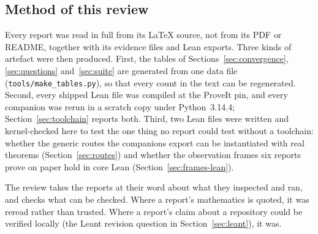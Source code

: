 \documentclass[11pt,a4paper]{article}
\newcommand{\code}[1]{\nolinkurl{#1}}
\theoremstyle{definition}
\theoremstyle{plain}
\begin{document}
\subsection{Method of this review}
Every report was read in full from its \LaTeX{} source, not from its PDF or README, together with its evidence files and Lean exports. Three kinds of artefact were then produced. First, the tables of Sections~\ref{sec:convergence}, \ref{sec:questions} and~\ref{sec:suite} are generated from one data file (\code{tools/make_tables.py}), so that every count in the text can be regenerated. Second, every shipped Lean file was compiled at the ProveIt pin, and every companion was rerun in a scratch copy under Python~3.14.4; Section~\ref{sec:toolchain} reports both. Third, two Lean files were written and kernel-checked here to test the one thing no report could test without a toolchain: whether the generic routes the companions export can be instantiated with real theorems (Section~\ref{sec:routes}) and whether the observation frames six reports prove on paper hold in core Lean (Section~\ref{sec:frames-lean}).

The review takes the reports at their word about what they inspected and ran, and checks what can be checked. Where a report's mathematics is quoted, it was reread rather than trusted. Where a report's claim about a repository could be verified locally (the Leant revision question in Section~\ref{sec:leant}), it was.
\end{document}
